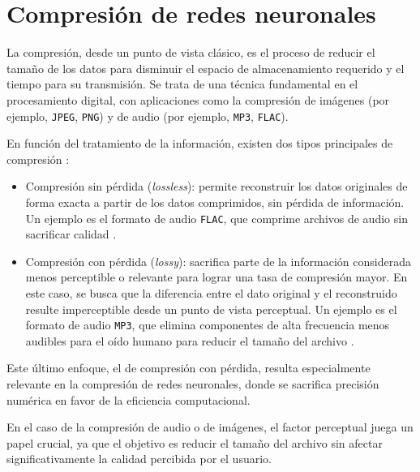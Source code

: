\section{Compresión de redes neuronales}
\label{sec:compresion_de_redes}

La compresión, desde un punto de vista clásico, es el proceso de reducir el tamaño de los datos para disminuir el espacio de almacenamiento requerido y el tiempo para su transmisión. Se trata de una técnica fundamental en el procesamiento digital, con aplicaciones como la compresión de imágenes (por ejemplo, \texttt{JPEG}, \texttt{PNG}) y de audio (por ejemplo, \texttt{MP3}, \texttt{FLAC}).

En función del tratamiento de la información, existen dos tipos principales de compresión \cite{Kavitha2016A}:

\begin{itemize}
    \item Compresión sin pérdida (\textit{lossless}): permite reconstruir los datos originales de forma exacta a partir de los datos comprimidos, sin pérdida de información. Un ejemplo es el formato de audio \texttt{FLAC}, que comprime archivos de audio sin sacrificar calidad \cite{flac_spec}.
    \item Compresión con pérdida (\textit{lossy}): sacrifica parte de la información considerada menos perceptible o relevante para lograr una tasa de compresión mayor. En este caso, se busca que la diferencia entre el dato original y el reconstruido resulte imperceptible desde un punto de vista perceptual. Un ejemplo es el formato de audio \texttt{MP3}, que elimina componentes de alta frecuencia menos audibles para el oído humano para reducir el tamaño del archivo \cite{brandenburg1999mp3}.
\end{itemize}

Este último enfoque, el de compresión con pérdida, resulta especialmente relevante en la compresión de redes neuronales, donde se sacrifica precisión numérica en favor de la eficiencia computacional.

En el caso de la compresión de audio o de imágenes, el factor perceptual juega un papel crucial, ya que el objetivo es reducir el tamaño del archivo sin afectar significativamente la calidad percibida por el usuario.


